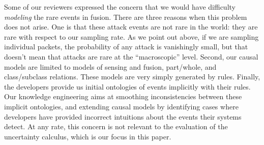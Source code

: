Some of our reviewers expressed the concern that we would have difficulty
\emph{modeling} the rare events in \ids fusion.  There are three
reasons when this problem does not
arise.  One is that these attack events are not rare in the
world: they are rare with respect to our sampling rate.  As we point out above,
if we are sampling individual packets, the probability of any attack is
vanishingly small, but that doesn't mean that attacks are rare at the
``macroscopic'' level.  Second, our causal models are limited to models of
sensing and fusion, part/whole, and class/subclass relations.  These models are
very simply generated by rules.  Finally, the \ids developers provide us initial
ontologies of events implicitly with their rules.  Our knowledge engineering
aims at smoothing inconsistencies between these implicit ontologies, and
extending causal models by identifying cases where \ids developers have
provided incorrect intuitions about the events their systems detect.
At any rate, this concern is not relevant to the evaluation of the uncertainty
calculus, which is our focus in this paper.

